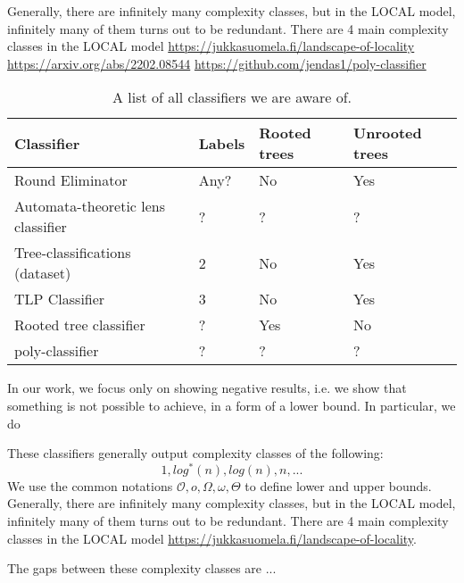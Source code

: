 Generally, there are infinitely many complexity classes, but in the LOCAL model, infinitely many of them turns out to be redundant.
There are 4 main complexity classes in the LOCAL model \url{https://jukkasuomela.fi/landscape-of-locality}
\url{https://arxiv.org/abs/2202.08544}
\url{https://github.com/jendas1/poly-classifier}
\begin{table}[h!]
\centering
\begin{tabular}{l l l l }
    \hline
    Classifier & Labels & Rooted trees & Unrooted trees \\
    \hline
    \hline
    Round Eliminator \cite{DBLP:conf/podc/Olivetti20, OlivettiRoundEliminatorGithub, DBLP:conf/podc/Brandt19}
    & {\color{red}Any?} & No & Yes \\ \hline
    Automata-theoretic lens classifier \cite{}
    & ? & ?   & ? \\ \hline
    Tree-classifications (dataset) \cite{TreeClassifications2020}
    & 2 & No  & Yes \\ \hline
    TLP Classifier \cite{RocherTlpClassifier2020, Rocher2020}
    & 3 & No  & Yes \\ \hline
    Rooted tree classifier \cite{RootedTreeClassifier2021, DBLP:conf/podc/Balliu0OSST21}
    & ? & Yes & No \\ \hline
    poly-classifier \cite{PolyClassifier2022, DBLP:journals/corr/abs-2202-08544}
    &?&?&? \\ \hline
\end{tabular}
\caption{A list of all classifiers we are aware of.} \label{tbl:classifiers}
\end{table}

In our work, we focus only on showing negative results, i.e. we show that something is not possible to achieve, in a form of a lower bound.
In particular, we do

These classifiers generally output complexity classes of the following:
\[1, log^*(n), log(n), n, ...\]
\todo{}
We use the common notations \(\mathcal{O}, o, \Omega, \omega, \Theta \) to define lower and upper bounds.
Generally, there are infinitely many complexity classes, but in the LOCAL model, infinitely many of them turns out to be redundant.
There are 4 main complexity classes in the LOCAL model \url{https://jukkasuomela.fi/landscape-of-locality}.

The gaps between these complexity classes are ... 
